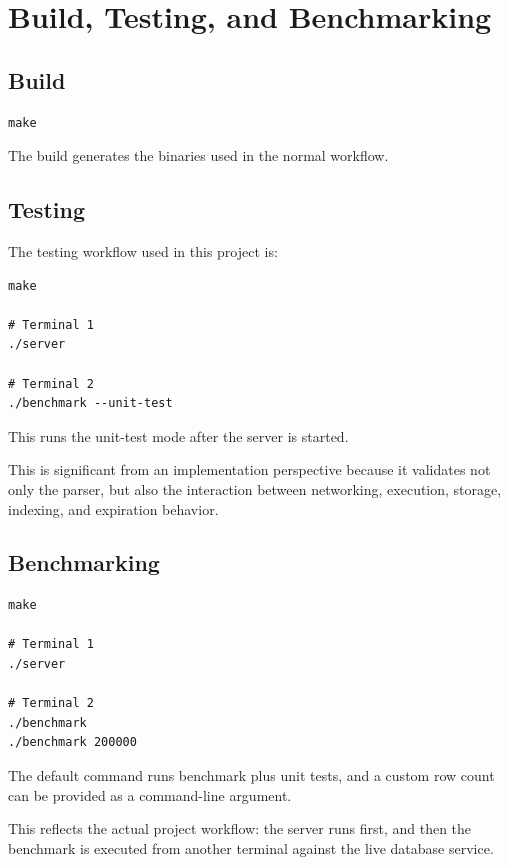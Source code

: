 \documentclass[12pt,a4paper]{article}
\begin{document}
\section{Build, Testing, and Benchmarking}

\subsection{Build}

\begin{lstlisting}[caption={Build command}]
make
\end{lstlisting}

The build generates the binaries used in the normal workflow.

\subsection{Testing}

The testing workflow used in this project is:

\begin{lstlisting}[caption={Unit-test workflow}]
make

# Terminal 1
./server

# Terminal 2
./benchmark --unit-test
\end{lstlisting}

This runs the unit-test mode after the server is started.

This is significant from an implementation perspective because it validates not
only the parser, but also the interaction between networking, execution,
storage, indexing, and expiration behavior.

\subsection{Benchmarking}

\begin{lstlisting}[caption={Benchmark workflow}]
make

# Terminal 1
./server

# Terminal 2
./benchmark
./benchmark 200000
\end{lstlisting}

The default command runs benchmark plus unit tests, and a custom row count can
be provided as a command-line argument.

This reflects the actual project workflow: the server runs first, and then the
benchmark is executed from another terminal against the live database service.
\end{document}
